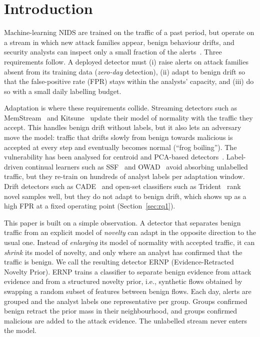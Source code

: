 \documentclass[preprint,12pt]{elsarticle}
\begin{document}
\section{Introduction}\label{sec:intro}
Machine-learning NIDS are trained on the traffic of a past period, but operate on a stream in which new attack families appear, benign behaviour drifts, and security analysts can inspect only a small fraction of the alerts~\cite{sommer2010outside,arp2022dos}. Three requirements follow. A deployed detector must (i) raise alerts on attack families absent from its training data (\emph{zero-day} detection), (ii) adapt to benign drift so that the false-positive rate (FPR) stays within the analysts' capacity, and (iii) do so with a small daily labelling budget.

Adaptation is where these requirements collide. Streaming detectors such as MemStream~\cite{bhatia2022memstream} and Kitsune~\cite{mirsky2018kitsune} update their model of normality with the traffic they accept. This handles benign drift without labels, but it also lets an adversary move the model: traffic that drifts slowly from benign towards malicious is accepted at every step and eventually becomes normal (``frog boiling''). The vulnerability has been analysed for centroid and PCA-based detectors~\cite{kloft2012security,rubinstein2009antidote}. Label-driven continual learners such as SSF~\cite{zhang2025ssf} and OWAD~\cite{han2023owad} avoid absorbing unlabelled traffic, but they re-train on hundreds of analyst labels per adaptation window. Drift detectors such as CADE~\cite{yang2021cade} and open-set classifiers such as Trident~\cite{zhao2024trident} rank novel samples well, but they do not adapt to benign drift, which shows up as a high FPR at a fixed operating point (Section~\ref{sec:rq1}).

This paper is built on a simple observation. A detector that separates benign traffic from an explicit model of \emph{novelty} can adapt in the opposite direction to the usual one. Instead of \emph{enlarging} its model of normality with accepted traffic, it can \emph{shrink} its model of novelty, and only where an analyst has confirmed that the traffic is benign. We call the resulting detector ERNP (Evidence-Retracted Novelty Prior). ERNP trains a classifier to separate benign evidence from attack evidence and from a structured novelty prior, i.e., synthetic flows obtained by swapping a random subset of features between benign flows. Each day, alerts are grouped and the analyst labels one representative per group. Groups confirmed benign retract the prior mass in their neighbourhood, and groups confirmed malicious are added to the attack evidence. The unlabelled stream never enters the model.
\end{document}
